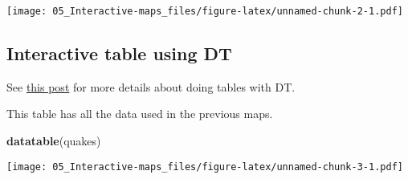 \documentclass[
]{article}
\newenvironment{Shaded}{\begin{snugshade}}{\end{snugshade}}
\newcommand{\FunctionTok}[1]{\textcolor[rgb]{0.13,0.29,0.53}{\textbf{#1}}}
\newcommand{\NormalTok}[1]{#1}
\begin{document}
\texttt{[image: 05\_Interactive-maps\_files/figure-latex/unnamed-chunk-2-1.pdf]}

\hypertarget{interactive-table-using-dt}{%
\subsection{Interactive table using
DT}\label{interactive-table-using-dt}}

See \href{https://rstudio.github.io/DT/}{this post} for more details
about doing tables with DT.

This table has all the data used in the previous maps.

\begin{Shaded}
\begin{Highlighting}[]
\FunctionTok{datatable}\NormalTok{(quakes)}
\end{Highlighting}
\end{Shaded}

\texttt{[image: 05\_Interactive-maps\_files/figure-latex/unnamed-chunk-3-1.pdf]}
\end{document}
